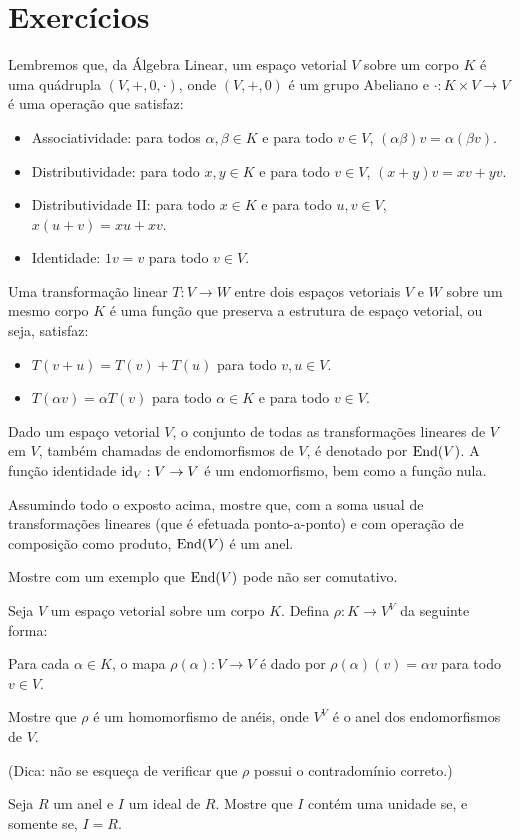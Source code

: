 \section{Exercícios}
\begin{exer}
Lembremos que, da Álgebra Linear, um espaço vetorial $V$ sobre um corpo $K$ é uma quádrupla $(V, +, 0, \cdot)$, onde $(V, +, 0)$ é um grupo Abeliano e $\cdot:K\times V\rightarrow V$ é uma operação que satisfaz:

\begin{itemize}
    \item Associatividade: para todos $\alpha, \beta \in K$ e para todo $v \in V$, $(\alpha\beta)v=\alpha(\beta v)$.
    \item Distributividade: para todo $x, y \in K$ e para todo $v \in V$, $(x+y)v=xv+yv$.
    \item Distributividade II: para todo $x \in K$ e para todo $u, v \in V$, $x(u+v)=xu+xv$.
    \item Identidade: $1v=v$ para todo $v \in V$.
\end{itemize}

Uma transformação linear $T:V\rightarrow W$ entre dois espaços vetoriais $V$ e $W$ sobre um mesmo corpo $K$ é uma função que preserva a estrutura de espaço vetorial, ou seja, satisfaz:

\begin{itemize}
    \item $T(v+u)=T(v)+T(u)$ para todo $v, u \in V$.
    \item $T(\alpha v)=\alpha T(v)$ para todo $\alpha \in K$ e para todo $v \in V$.
\end{itemize}

Dado um espaço vetorial $V$, o conjunto de todas as transformações lineares de $V$ em $V$, também chamadas de endomorfismos de $V$, é denotado por $\operatorname{End}(V)$.
A função identidade $\operatorname{id}_V:V\rightarrow V$ é um endomorfismo, bem como a função nula.

Assumindo todo o exposto acima, mostre que, com a soma usual de transformações lineares (que é efetuada ponto-a-ponto) e com operação de composição como produto, $\operatorname{End}(V)$ é um anel.

Mostre com um exemplo que $\operatorname{End}(V)$ pode não ser comutativo.
\end{exer}

\begin{exer}
Seja $V$ um espaço vetorial sobre um corpo $K$.
Defina $\rho:K\rightarrow V^V$ da seguinte forma: 

Para cada $\alpha \in K$, o mapa $\rho(\alpha):V\rightarrow V$ é dado por $\rho(\alpha)(v)=\alpha v$ para todo $v \in V$.

Mostre que $\rho$ é um homomorfismo de anéis, onde $V^V$ é o anel dos endomorfismos de $V$.

(Dica: não se esqueça de verificar que $\rho$ possui o contradomínio correto.)
\end{exer}

\begin{exer}
    Seja $R$ um anel e $I$ um ideal de $R$.
    Mostre que $I$ contém uma unidade se, e somente se, $I=R$.
\end{exer}